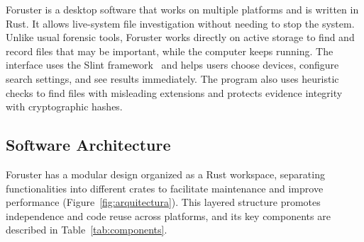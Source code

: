 \documentclass[preprint,12pt,a4paper]{elsarticle}
\begin{document}
Foruster is a desktop software that works on multiple platforms and is written in Rust. It allows live-system file investigation without needing to stop the system. Unlike usual forensic tools, Foruster works directly on active storage to find and record files that may be important, while the computer keeps running. The interface uses the Slint framework~\cite{slint_doc} and helps users choose devices, configure search settings, and see results immediately. The program also uses heuristic checks to find files with misleading extensions and protects evidence integrity with cryptographic hashes.

\subsection{Software Architecture}

Foruster has a modular design organized as a Rust workspace, separating functionalities into different crates to facilitate maintenance and improve performance (Figure~\ref{fig:arquitectura}). This layered structure promotes independence and code reuse across platforms, and its key components are described in Table~\ref{tab:components}.
\end{document}
